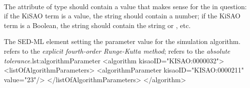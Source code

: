 \paragraph*{}
The attribute  of type  should contain a value that makes sense for the  in question:  if the KiSAO term is a value, the string should contain a number; if the KiSAO term is a Boolean, the string should contain the string  or , etc.

\begin{myXmlLst}{The SED-ML  element setting the parameter value for the simulation algorithm.  refers to the \emph{explicit fourth-order Runge-Kutta method};  refers to the \emph{absolute tolerance}.}{lst:algorithmParameter}
<algorithm kisaoID="KISAO:0000032"> 
	<listOfAlgorithmParameters> 
		<algorithmParameter kisaoID="KISAO:0000211" value="23"/> 
	</listOfAlgorithmParameters> 
</algorithm>
\end{myXmlLst}


